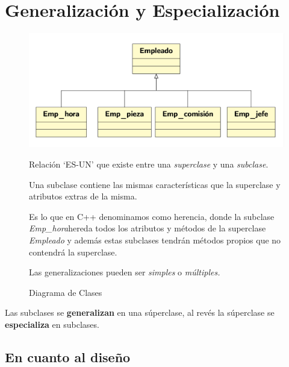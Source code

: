 \chapter{Generalización y Especialización}

\begin{figure}[h]
  \begin{minipage}{0.5\textwidth}
    \includegraphics[width=\textwidth]{Imagenes/gen1.png}
    \caption{Diagrama de Clases}
  \end{minipage}
  \begin{minipage}{0.5\textwidth}
      \vspace{-1\baselineskip} %
Relación ‘ES-UN’ que existe entre una \textit{superclase} y una \textit{subclase}.

Una subclase contiene las mismas características que la superclase y atributos extras de la misma.

Es lo que en C++ denominamos como herencia, donde la subclase \textit{Emp\_hora}hereda todos los atributos y métodos de la superclase \textit{Empleado} y además estas subclases tendrán métodos propios que no contendrá la superclase.

Las generalizaciones pueden ser \textit{simples} o \textit{múltiples.}
  \end{minipage}
\end{figure}

Las subclases se \textbf{generalizan} en una súperclase, al revés la súperclase se \textbf{especializa} en subclases.

\section{En cuanto al diseño}
